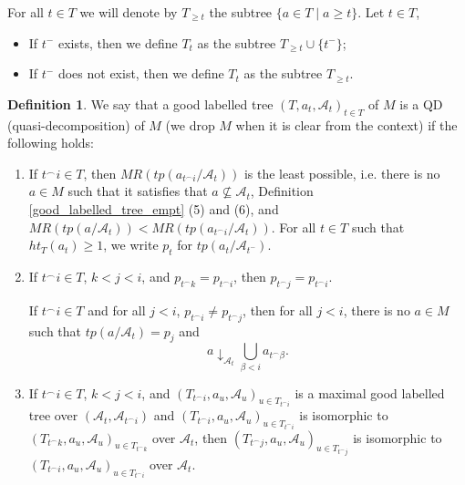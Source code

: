 \documentclass[12pt,a4paper]{amsart}
\theoremstyle{definition}
\newtheorem{defn}[thm]{Definition}
\theoremstyle{remark}
\renewcommand{\mid}{\mathrel{|}\allowbreak}
\begin{document}
For all $t\in T$ we will denote by $T_{\ge t}$ the subtree $\{a\in T\mid a\ge t\}$. Let $t\in T$,
\begin{itemize}
    \item If $t^-$ exists, then we define $T_t$ as the subtree $T_{\ge t}\cup \{t^-\}$;
    \item If $t^-$ does not exist, then we define $T_t$ as the subtree $T_{\ge t}$. 
\end{itemize}

\begin{defn}\label{QD_over}
    We say that a good labelled tree $(T,a_t,\mathcal{A}_t)_{t\in T}$ of $M$ is a QD (quasi-decomposition) of $M$ (we drop $M$ when it is clear from the context) if the following holds:
    \begin{enumerate}
        \item If $t^\frown i\in T$, then $MR(tp(a_{t^\frown i}/\mathcal{A}_{t}))$ is the least possible, i.e. there is no $a\in M$ such that it satisfies that $a\not\subseteq \mathcal{A}_t$, Definition \ref{good_labelled_tree_empt} (5) and (6), and $MR(tp(a/\mathcal{A}_{t}))<MR(tp(a_{t^\frown i}/\mathcal{A}_{t}))$.
        For all $t\in T$ such that $ht_T(a_t)\ge 1$, we write $p_t$ for $tp(a_t/\mathcal{A}_{t^-})$.
        \item If $t^\frown i\in T$, $k<j<i$, and $p_{t^\frown k}=p_{t^\frown i}$, then $p_{t^\frown j}= p_{t^\frown i}$.
        
        If $t^\frown i\in T$ and for all $j<i$, $p_{t^\frown i}\neq p_{t^\frown j}$, then for all $j<i$, there is no $a\in M$ such that $tp(a/\mathcal{A}_t)=p_j$ and $$a\downarrow_{\mathcal{A}_t} \bigcup_{\beta<i}a_{t^\frown \beta}.$$
         
        \item If $t^\frown i\in T$, $k<j<i$, and $(T_{t^\frown i}, a_u, \mathcal{A}_u)_{u\in T_{t^\frown i}}$ is a maximal good labelled tree over $(\mathcal{A}_t,\mathcal{A}_{t^\frown i})$ and $(T_{t^\frown i}, a_u, \mathcal{A}_u)_{u\in T_{t^\frown i}}$ is isomorphic to $(T_{t^\frown k}, a_u, \mathcal{A}_u)_{u\in T_{t^\frown k}}$ over $\mathcal{A}_t$, then $(T_{t^\frown j}, a_u, \mathcal{A}_u)_{u\in T_{t^\frown j}}$ is isomorphic to $(T_{t^\frown i}, a_u, \mathcal{A}_u)_{u\in T_{t^\frown i}}$ over $\mathcal{A}_t$.
        

\end{enumerate}
\end{defn}
\end{document}
